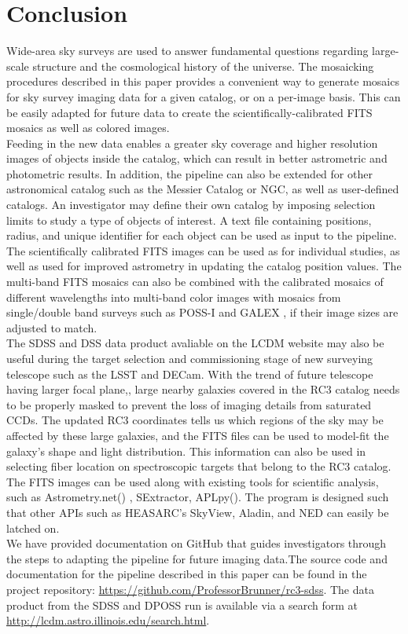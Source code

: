 \documentclass[5p]{elsarticle}
\begin{document}
 \section{Conclusion}
\indent Wide-area sky surveys are used to answer fundamental questions regarding large-scale structure and the cosmological history of the universe. The mosaicking procedures described in this paper provides a convenient way to generate mosaics for sky survey imaging data for a given catalog, or on a per-image basis. This can be easily adapted for future data to create the scientifically-calibrated FITS mosaics as well as colored images. 
\\
\indent Feeding in the new data enables a greater  sky coverage and higher resolution images of objects inside the catalog, which can result in better astrometric and photometric results.  In addition, the pipeline can also be extended for other astronomical catalog such as the Messier Catalog or NGC, as well as user-defined catalogs. An investigator may define their own catalog by imposing selection limits to study a type of objects of interest. A text file containing positions, radius, and unique identifier for each object can be used as input to the pipeline. The scientifically calibrated FITS images can be used as for individual studies, as well as used for improved astrometry in updating the catalog position values. The multi-band FITS mosaics can also be combined with the calibrated mosaics of different wavelengths into multi-band color images with mosaics from single/double band surveys such as POSS-I and GALEX , if their image sizes are adjusted to match.  %
\\
\indent The SDSS and DSS data product avaliable on the LCDM website may also be useful  during  the target selection and commissioning stage of new surveying telescope such as the LSST and DECam. With the trend of future telescope having larger focal plane,, large nearby galaxies covered in the RC3 catalog needs to be properly masked to prevent the loss of imaging details from saturated CCDs. The updated RC3 coordinates tells us  which regions of the sky may be affected by these large galaxies, and the FITS files can be used to model-fit the galaxy's shape and light distribution. This information can also be used in selecting fiber location on spectroscopic targets that belong to the RC3 catalog. The FITS images can be used along with existing tools for scientific analysis, such as Astrometry.net(\citet{astrometry.net}) , SExtractor, APLpy(\citet{aplpy}). The program is designed such that other APIs such as HEASARC's SkyView, Aladin, and NED can easily be latched on.
\\
\indent We have provided documentation on GitHub  that guides investigators through the steps to adapting the pipeline for future imaging data.The source code and documentation for the pipeline described in this paper can be found in the project repository: \url{https://github.com/ProfessorBrunner/rc3-sdss}. The data product from the SDSS and DPOSS run is available via a search form at \url{http://lcdm.astro.illinois.edu/search.html}.
\end{document}
